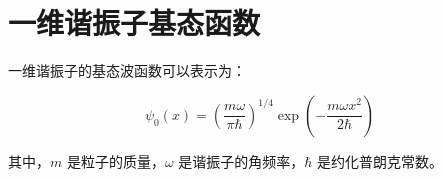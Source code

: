 \documentclass{article}
\begin{document}
\section*{一维谐振子基态函数}

一维谐振子的基态波函数可以表示为：

\[
\psi_0(x) = \left( \frac{m\omega}{\pi \hbar} \right)^{1/4} \exp\left( -\frac{m\omega x^2}{2\hbar} \right)
\]

其中，$m$ 是粒子的质量，$\omega$ 是谐振子的角频率，$\hbar$ 是约化普朗克常数。
\end{document}
